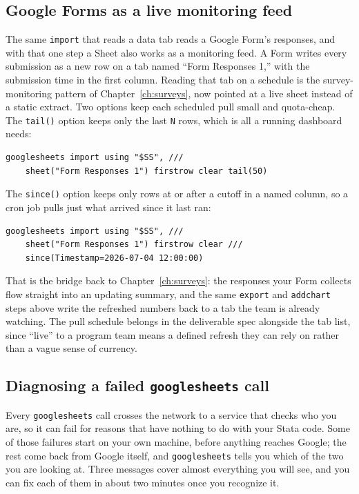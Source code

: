\subsection{Google Forms as a live monitoring feed}
The same \texttt{import} that reads a data tab reads a Google Form's responses, and with that one step a Sheet also works as a monitoring feed. A Form writes every submission as a new row on a tab named \enquote{Form Responses 1,} with the submission time in the first column. Reading that tab on a schedule is the survey-monitoring pattern of Chapter~\ref{ch:surveys}, now pointed at a live sheet instead of a static extract. Two options keep each scheduled pull small and quota-cheap. The \texttt{tail()} option keeps only the last \texttt{N} rows, which is all a running dashboard needs:
\par
{\footnotesize
\begin{verbatim}
googlesheets import using "$SS", ///
    sheet("Form Responses 1") firstrow clear tail(50)
\end{verbatim}
}
The \texttt{since()} option keeps only rows at or after a cutoff in a named column, so a cron job pulls just what arrived since it last ran:
\par
{\footnotesize
\begin{verbatim}
googlesheets import using "$SS", ///
    sheet("Form Responses 1") firstrow clear ///
    since(Timestamp=2026-07-04 12:00:00)
\end{verbatim}
}
That is the bridge back to Chapter~\ref{ch:surveys}: the responses your Form collects flow straight into an updating summary, and the same \texttt{export} and \texttt{addchart} steps above write the refreshed numbers back to a tab the team is already watching. The pull schedule belongs in the deliverable spec alongside the tab list, since \enquote{live} to a program team means a defined refresh they can rely on rather than a vague sense of currency.

\subsection{Diagnosing a failed \texttt{googlesheets} call}\label{sec:ch11-gs-failures}
Every \texttt{googlesheets} call crosses the network to a service that checks who you are, so it can fail for reasons that have nothing to do with your Stata code. Some of those failures start on your own machine, before anything reaches Google; the rest come back from Google itself, and \texttt{googlesheets} tells you which of the two you are looking at. Three messages cover almost everything you will see, and you can fix each of them in about two minutes once you recognize it.

